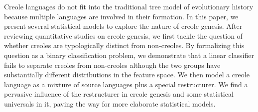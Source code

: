 Creole languages do not fit into the traditional tree model of evolutionary history because multiple languages are involved in their formation. In this paper, we present several statistical models to explore the nature of creole genesis. After reviewing quantitative studies on creole genesis, we first tackle the question of whether creoles are typologically distinct from non-creoles. By formalizing this question as a binary classification problem, we demonstrate that a linear classifier fails to separate creoles from non-creoles although the two groups have substantially different distributions in the feature space. We then model a creole language as a mixture of source languages plus a special restructurer. We find a pervasive influence of the restructurer in creole genesis and some statistical universals in it, paving the way for more elaborate statistical models.
